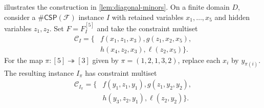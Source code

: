 \documentclass[11pt,letterpaper,onecolumn]{article}
\theoremstyle{plain}
\theoremstyle{definition}
\theoremstyle{remark}
\newcommand{\cF}{\mathcal F}
\newcommand{\CSP}[1]{\mathsf{\#CSP}(#1)}
\begin{document}
 illustrates the construction in
\cref{lem:diagonal-minors}.
On a finite domain $D$, consider a $\CSP{\cF}$ instance $I$ with retained
variables $x_1,\ldots,x_5$ and hidden variables $z_1,z_2$.
Set $F=F_I^{[5]}$ and take the constraint multiset
\begin{equation*}
\begin{aligned}
  \mathcal C_I=\{&f(x_1,z_1,x_3),
                  g(z_1,x_2,x_5),\\
                 &h(x_4,z_2,x_3),
                  \ell(z_2,x_5)\}.
\end{aligned}
\end{equation*}
For the map $\pi:[5]\twoheadrightarrow[3]$ given by
$\pi=(1,2,1,3,2)$, replace each $x_i$ by $y_{\pi(i)}$.
The resulting instance $I_\pi$ has constraint multiset
\[
\begin{aligned}
  \mathcal C_{I_\pi}=\{&f(y_1,z_1,y_1),
                        g(z_1,y_2,y_2),\\
                       &h(y_3,z_2,y_1),
                        \ell(z_2,y_2)\}.
\end{aligned}
\]
\end{document}
